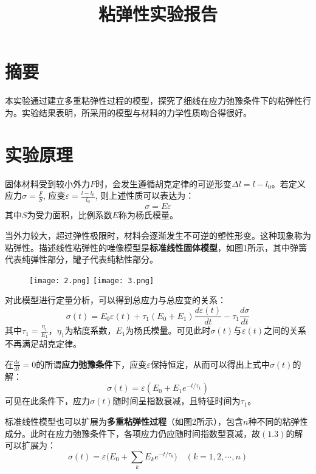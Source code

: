 \documentclass{ctexart}
\title{粘弹性实验报告}
\begin{document}
\maketitle

\section*{摘要}
本实验通过建立多重粘弹性过程的模型，探究了细线在应力弛豫条件下的粘弹性行为。实验结果表明，所采用的模型与材料的力学性质吻合得很好。


\section{实验原理}
固体材料受到较小外力$F$时，会发生遵循胡克定律的可逆形变$\Delta l=l-l_0$。若定义应力$\sigma=\frac{F}{S}$, 应变$\varepsilon=\frac{l-l_0}{l_0}$, 则上述性质可以表达为：
\begin{equation}
  \sigma=E\varepsilon
\end{equation}
其中$S$为受力面积，比例系数$E$称为杨氏模量。

当外力较大，超过弹性极限时，材料会逐渐发生不可逆的塑性形变。这种现象称为粘弹性。描述线性粘弹性的唯像模型是\textbf{标准线性固体模型}，如图1所示，其中弹簧代表纯弹性部分，罐子代表纯粘性部分。
\begin{figure}[h]                                           
  \texttt{[image: 2.png]}
  \qquad
  \texttt{[image: 3.png]}
\end{figure}

对此模型进行定量分析，可以得到总应力与总应变的关系：
\begin{equation}
  \sigma(t)=E_0\varepsilon(t)+\tau_1(E_0+E_1)\frac{d\varepsilon(t)}{dt}-\tau_1\frac{d\sigma}{dt}
\end{equation}
其中$\tau_1=\frac{\eta_1}{E_1}$，$\eta_1$为粘度系数，$E_1$为杨氏模量。可见此时$\sigma(t)$与$\varepsilon(t)$之间的关系不再满足胡克定律。

在$\displaystyle\frac{d\varepsilon}{dt}=0$的所谓\textbf{应力弛豫条件}下，应变$\varepsilon$保持恒定，从而可以得出上式中$\sigma(t)$的解：
\begin{equation}
  \sigma(t)=\varepsilon(E_0+E_1e^{-t/\tau_1})
\end{equation}
可见在此条件下，应力$\sigma(t)$随时间呈指数衰减，且特征时间为$\tau_1$。

标准线性模型也可以扩展为\textbf{多重粘弹性过程}（如图2所示），包含$n$种不同的粘弹性成分。此时在应力弛豫条件下，各项应力仍应随时间指数型衰减，故$(1.3)$的解可以扩展为：
\begin{equation}
  \sigma(t)=\varepsilon\Big(E_0+\sum_kE_ke^{-t/\tau_k}\Big)\quad (k=1,2,\cdots,n)
\end{equation}
\end{document}
